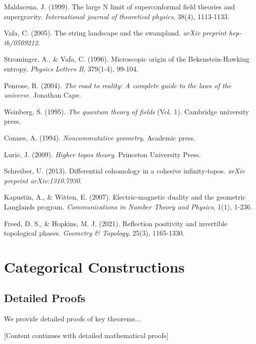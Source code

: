 \documentclass[12pt,a4paper]{article}
\begin{document}
\begin{thebibliography}{99}
Maldacena, J. (1999). The large N limit of superconformal field theories and supergravity. \emph{International journal of theoretical physics}, 38(4), 1113-1133.

Vafa, C. (2005). The string landscape and the swampland. \emph{arXiv preprint hep-th/0509212}.

Strominger, A., \& Vafa, C. (1996). Microscopic origin of the Bekenstein-Hawking entropy. \emph{Physics Letters B}, 379(1-4), 99-104.

Penrose, R. (2004). \emph{The road to reality: A complete guide to the laws of the universe}. Jonathan Cape.

Weinberg, S. (1995). \emph{The quantum theory of fields} (Vol. 1). Cambridge university press.

Connes, A. (1994). \emph{Noncommutative geometry}. Academic press.

Lurie, J. (2009). \emph{Higher topos theory}. Princeton University Press.

Schreiber, U. (2013). Differential cohomology in a cohesive infinity-topos. \emph{arXiv preprint arXiv:1310.7930}.

Kapustin, A., \& Witten, E. (2007). Electric-magnetic duality and the geometric Langlands program. \emph{Communications in Number Theory and Physics}, 1(1), 1-236.

Freed, D. S., \& Hopkins, M. J. (2021). Reflection positivity and invertible topological phases. \emph{Geometry \& Topology}, 25(3), 1165-1330.

\end{thebibliography}

\appendix

\section{Categorical Constructions}

\subsection{Detailed Proofs}

We provide detailed proofs of key theorems...

[Content continues with detailed mathematical proofs]
\end{document}
